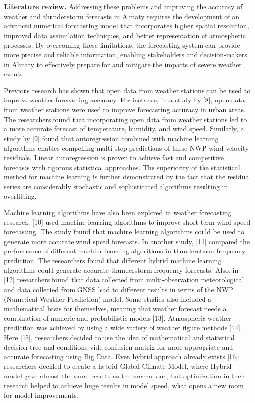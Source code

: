 \begin{multicols}{2}
{\bfseries Literature review.} Addressing these problems and improving the
accuracy of weather and thunderstorm forecasts in Almaty requires the
development of an advanced numerical forecasting model that incorporates
higher spatial resolution, improved data assimilation techniques, and
better representation of atmospheric processes. By overcoming these
limitations, the forecasting system can provide more precise and
reliable information, enabling stakeholders and decision-makers in
Almaty to effectively prepare for and mitigate the impacts of severe
weather events.

Previous research has shown that open data from weather stations can be
used to improve weather forecasting accuracy. For instance, in a study
by {[}8{]}, open data from weather stations were used to improve
forecasting accuracy in urban areas. The researchers found that
incorporating open data from weather stations led to a more accurate
forecast of temperature, humidity, and wind speed. Similarly, a study by
{[}9{]} found that autoregression combined with machine learning
algorithms enables compelling multi-step predictions of these NWP wind
velocity residuals. Linear autoregression is proven to achieve fast and
competitive forecasts with rigorous statistical approaches. The
superiority of the statistical method for machine learning is further
demonstrated by the fact that the residual series are considerably
stochastic and sophisticated algorithms resulting in overfitting.

Machine learning algorithms have also been explored in weather
forecasting research. {[}10{]} used machine learning algorithms to
improve short-term wind speed forecasting. The study found that machine
learning algorithms could be used to generate more accurate wind speed
forecasts. In another study, {[}11{]} compared the performance of
different machine learning algorithms in thunderstorm frequency
prediction. The researchers found that different hybrid machine learning
algorithms could generate accurate thunderstorm frequency forecasts.
Also, in {[}12{]} researchers found that data collected from
multi-observation meteorological and data collected from GNSS lead to
different results in terms of the NWP (Numerical Weather Prediction)
model. Some studies also included a mathematical basis for themselves,
meaning that weather forecast needs a combination of numeric and
probabilistic models {[}13{]}. Atmospheric weather prediction was
achieved by using a wide variety of weather figure methods {[}14{]}.
Here {[}15{]}, researchers decided to use the idea of mathematical and
statistical decision tree and conditions vide confusion matrix for more
appropriate and accurate forecasting using Big Data. Even hybrid
approach already exists {[}16{]}: researchers decided to create a hybrid
Global Climate Model, where Hybrid model gave almost the same results as
the normal one, but optimization in their research helped to achieve
huge results in model speed, what opens a new room for model
improvements.


\end{multicols}

